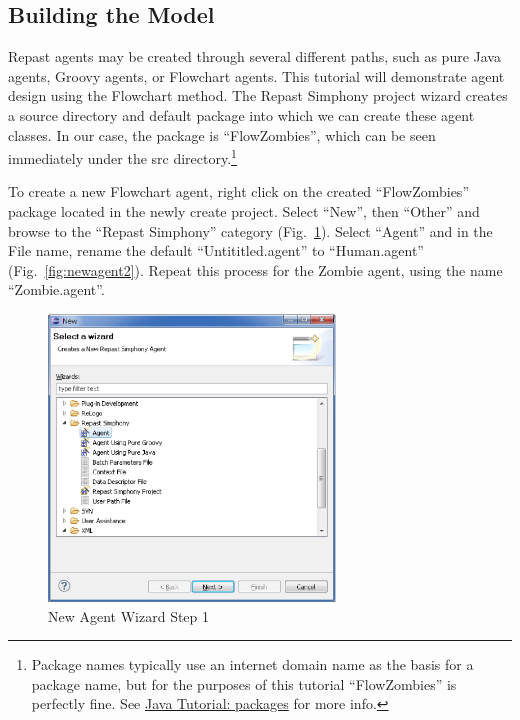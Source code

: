 \documentclass[11pt]{amsart}
\begin{document}
\subsection{Building the Model}
Repast agents may be created through several different paths, such as pure Java agents, Groovy agents, or Flowchart agents.  This tutorial will demonstrate agent design using the Flowchart method.  The Repast Simphony project wizard creates a source directory and default package into which we can create these agent classes. In our case, the package is ``FlowZombies'', which can be seen immediately under the src directory.\footnote{Package names typically use an internet domain name as the basis for a package name, but for the purposes of this tutorial ``FlowZombies'' is perfectly fine. See  \href{http://download.oracle.com/javase/tutorial/java/package/namingpkgs.html}{Java Tutorial: packages} for more info.} 

To create a new Flowchart agent, right click on the created ``FlowZombies'' package located in the newly create project.  Select ``New'', then ``Other'' and browse to the ``Repast Simphony'' category (Fig.~\ref{fig:newagent1}).  Select ``Agent'' and in the File name, rename the default ``Untititled.agent'' to ``Human.agent'' (Fig.~\ref{fig:newagent2}).  Repeat this process for the Zombie agent, using the name ``Zombie.agent''. 

\begin{figure}[h]
\begin{center}
\vspace{.2in}
\centerline {
\includegraphics[width=3in]{figs/newAgentWiz_1.eps}
}
\caption{New Agent Wizard Step 1}
\label{fig:newagent1}
\end{center}
\end{figure}
\end{document}
